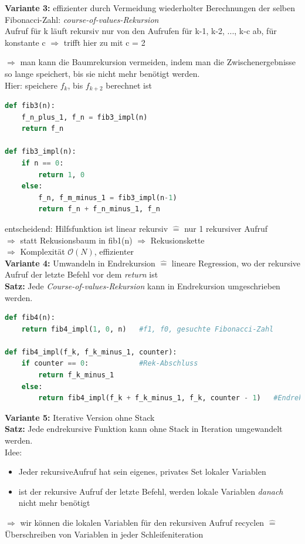 \documentclass[11pt, fleqn]{scrreprt}
\begin{document}
\textbf{Variante 3:} effizienter durch Vermeidung wiederholter Berechnungen der selben Fibonacci-Zahl: \emph{course-of-values-Rekursion} \\

Aufruf für k läuft rekursiv nur von den Aufrufen für k-1, k-2, ..., k-c ab, für konstante c $\Rightarrow$ trifft hier zu mit c = 2

$\Rightarrow$ man kann die Baumrekursion vermeiden, indem man die Zwischenergebnisse so lange speichert, bis sie nicht mehr benötigt werden. \\

Hier: speichere $f_k$, bis $f_{k+2}$ berechnet ist
\begin{lstlisting}[language=Python]
def fib3(n):
	f_n_plus_1, f_n = fib3_impl(n)
	return f_n

def fib3_impl(n):
	if n == 0:
		return 1, 0
	else: 
		f_n, f_m_minus_1 = fib3_impl(n-1)
		return f_n + f_n_minus_1, f_n
\end{lstlisting}
entscheidend: Hilfsfunktion ist linear rekursiv $\widehat{=}$ nur 1 rekursiver Aufruf \\
$\Rightarrow$ statt Rekusionsbaum in fib1(n) $\Rightarrow$ Rekusionskette\\
$\Rightarrow$ Komplexität $\mathcal{O}(N)$, effizienter\\

\textbf{Variante 4:} Umwandeln in Endrekursion $\widehat{=}$ lineare Regression, wo der rekursive Aufruf der letzte Befehl vor dem \emph{return} ist \\

\textbf{Satz:} Jede \emph{Course-of-values-Rekursion} kann in Endrekursion umgeschrieben werden.

\begin{lstlisting}[language=Python]
def fib4(n):
	return fib4_impl(1, 0, n)   #f1, f0, gesuchte Fibonacci-Zahl

def fib4_impl(f_k, f_k_minus_1, counter):
	if counter == 0:            #Rek-Abschluss
		return f_k_minus_1
	else:
		return fib4_impl(f_k + f_k_minus_1, f_k, counter - 1)   #Endrekursion
\end{lstlisting}

\textbf{Variante 5: }Iterative Version ohne Stack\\

\textbf{Satz:} Jede endrekursive Funktion kann ohne Stack in Iteration umgewandelt werden. \\
Idee: 
\begin{itemize}
	\item Jeder rekursiveAufruf hat sein eigenes, privates Set lokaler Variablen
	\item ist der rekursive Aufruf der letzte Befehl, werden lokale Variablen \emph{danach} nicht mehr benötigt
\end{itemize}
$\Rightarrow$ wir können die lokalen Variablen für den rekursiven Aufruf recyclen $\widehat{=}$ Überschreiben von Variablen in jeder Schleifeniteration \\
\end{document}
